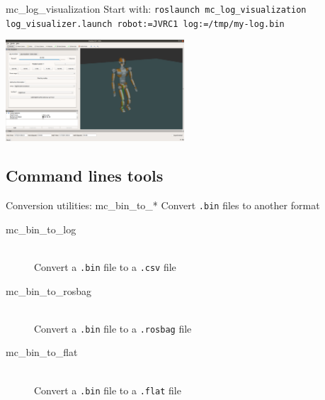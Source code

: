 \documentclass[c,aspectratio=169]{beamer}
\begin{document}
\begin{frame}[fragile]{mc\_log\_visualization}
  Start with: \scriptsize \verb|roslaunch mc_log_visualization log_visualizer.launch robot:=JVRC1 log:=/tmp/my-log.bin|

  \begin{center}
    \includegraphics[width=0.5\textwidth]{img/mc_log_visualization.png}
  \end{center}
\end{frame}

\subsection{Command lines tools}

\begin{frame}[fragile]{Conversion utilities: mc\_bin\_to\_*}
  Convert \verb|.bin| files to another format

  \medskip

  \begin{description}
    \item[mc\_bin\_to\_log] \hfill \\ Convert a \verb|.bin| file to a \verb|.csv| file
    \item[mc\_bin\_to\_rosbag] \hfill \\ Convert a \verb|.bin| file to a \verb|.rosbag| file
    \item[mc\_bin\_to\_flat] \hfill \\ Convert a \verb|.bin| file to a \verb|.flat| file
  \end{description}
\end{frame}
\end{document}
